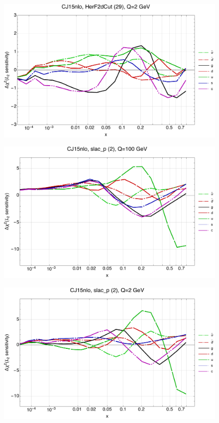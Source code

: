 \documentclass[10pt,aps,prd,floatfix,titlepage]{revtex4}
\begin{document}
\begin{figure}
\includegraphics[width=\textwidth,height=0.44\textheight,keepaspectratio]{1/29_CJ15nlo_L2_q2_Sf_1.pdf}
\caption{}
\end{figure}
\clearpage
\begin{figure}
\includegraphics[width=\textwidth,height=0.44\textheight,keepaspectratio]{1/2_CJ15nlo_L2_q100_Sf_1.pdf}
\caption{}
\end{figure}
\begin{figure}
\includegraphics[width=\textwidth,height=0.44\textheight,keepaspectratio]{1/2_CJ15nlo_L2_q2_Sf_1.pdf}
\caption{}
\end{figure}
\end{document}
